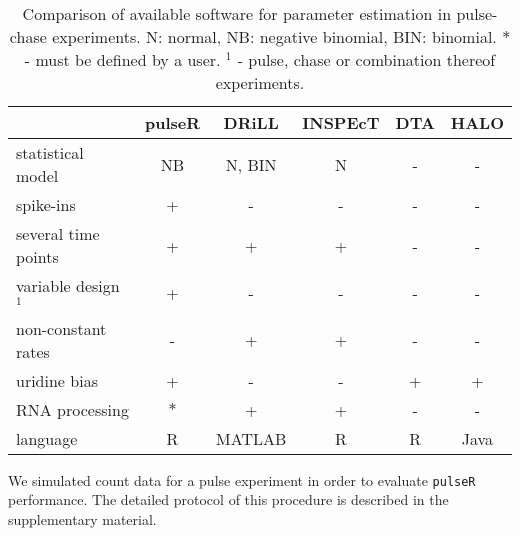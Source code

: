 \begin{table}
 \begin{tabular}{|l|c|c|c|c|c|}\hline
                        &pulseR &DRiLL          &INSPEcT&DTA    &HALO       \\\hline
 statistical model      & NB    &N, BIN         &N       & -    & -      \\\hline                         
 spike-ins              & +     &   -           &  -     &  -    & -         \\\hline               
 several time points    & +     &   +           &  +     &  -    & -         \\\hline                    
  variable design $^1$       & +     &   -           &  -     &  -    & -         \\\hline 
 non-constant rates     & -     &   +           &  +     &  -    & -         \\\hline 
            uridine bias& +     &   -           &  -     &  +    & +         \\\hline 
       RNA processing   &$\ast$ &   +           &  +     &  -    & -         \\\hline 
  language              & R     &MATLAB         &  R     &  R    & Java      \\\hline 
 \end{tabular}
\caption{Comparison of available software for parameter estimation in 
pulse-chase experiments. N: normal, NB: negative binomial, BIN: binomial.
$\ast$ - must be defined by a user. $^1$ - pulse, chase or combination thereof experiments.
}
\end{table}
We simulated count data for a pulse experiment 
in order to evaluate \verb|pulseR| performance.
The  detailed protocol of this procedure is described in the supplementary material.

